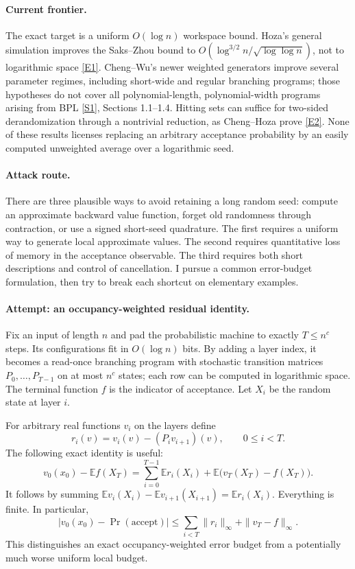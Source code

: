 \documentclass[11pt,a4paper]{article}
\newcommand{\E}{\mathbb{E}}
\newcommand{\sref}[2]{\hyperlink{source:#1:#2}{[S#2]}}
\newcommand{\eref}[2]{\hyperlink{extra:#1:#2}{[E#2]}}
\numberwithin{equation}{section}
\begin{document}
\paragraph{Current frontier.}
The exact target is a uniform $O(\log n)$ workspace bound. Hoza's general
simulation improves the Saks--Zhou bound to
$O(\log^{3/2}n/\sqrt{\log\log n})$, not to logarithmic space
\eref{163}{1}. Cheng--Wu's newer weighted generators improve several
parameter regimes, including short-wide and regular branching programs;
those hypotheses do not cover all polynomial-length, polynomial-width
programs arising from BPL \sref{163}{1}, Sections 1.1--1.4. Hitting sets
can suffice for two-sided derandomization through a nontrivial reduction,
as Cheng--Hoza prove \eref{163}{2}. None of these results licenses
replacing an arbitrary acceptance probability by an easily computed
unweighted average over a logarithmic seed.

\paragraph{Attack route.}
There are three plausible ways to avoid retaining a long random seed:
compute an approximate backward value function, forget old randomness
through contraction, or use a signed short-seed quadrature. The first
requires a uniform way to generate local approximate values. The second
requires quantitative loss of memory in the acceptance observable. The
third requires both short descriptions and control of cancellation.
I pursue a common error-budget formulation, then try to break each
shortcut on elementary examples.

\paragraph{Attempt: an occupancy-weighted residual identity.}
Fix an input of length $n$ and pad the probabilistic machine to exactly
$T\le n^c$ steps. Its configurations fit in $O(\log n)$ bits. By adding
a layer index, it becomes a read-once branching program with stochastic
transition matrices $P_0,\ldots,P_{T-1}$ on at most $n^c$ states; each
row can be computed in logarithmic space. The terminal function $f$ is
the indicator of acceptance. Let $X_i$ be the random state at layer $i$.

For arbitrary real functions $v_i$ on the layers define
\[
 r_i(v)=v_i(v)-(P_iv_{i+1})(v),\qquad 0\le i<T.
\]
The following exact identity is useful:
\begin{equation}\label{163:residual}
 v_0(x_0)-\E f(X_T)
 =\sum_{i=0}^{T-1}\E r_i(X_i)
       +\E\bigl(v_T(X_T)-f(X_T)\bigr).
\end{equation}
It follows by summing
$\E v_i(X_i)-\E v_{i+1}(X_{i+1})=\E r_i(X_i)$.
Everything is finite. In particular,
\begin{equation}\label{163:residual-bound}
 |v_0(x_0)-\Pr(\mathrm{accept})|
 \le\sum_{i<T}\|r_i\|_\infty+\|v_T-f\|_\infty.
\end{equation}
This distinguishes an exact occupancy-weighted error budget from a
potentially much worse uniform local budget.
\end{document}

